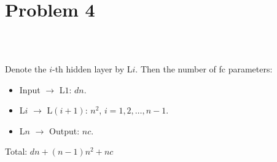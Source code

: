 \section{Problem 4}~\label{sec:prob4}

\subsection{} %

Denote the $i$-th hidden layer by L$i$.
Then the number of fc parameters:

\begin{itemize}
    \item Input $\to$ L$1$: $dn$.
    \item L$i$ $\to$ L$(i+1)$: $n^2$, $i=1,2,\dots,n-1$.
    \item L$n$ $\to$ Output: $nc$.
\end{itemize}

Total: $dn + (n-1)n^2 + nc$

\subsection{} %

\subsection{} %

